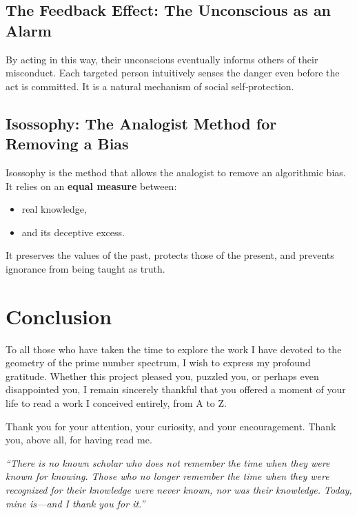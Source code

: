 \documentclass[12pt,oneside]{article}
\begin{document}
\subsection{The Feedback Effect: The Unconscious as an Alarm}

By acting in this way, their unconscious eventually informs others of their misconduct.  
Each targeted person intuitively senses the danger even before the act is committed.  
It is a natural mechanism of social self‑protection.

\subsection{Isossophy: The Analogist Method for Removing a Bias}

Isossophy is the method that allows the analogist to remove an algorithmic bias.  
It relies on an \textbf{equal measure} between:

\begin{itemize}
    \item real knowledge,
    \item and its deceptive excess.
\end{itemize}

It preserves the values of the past, protects those of the present, and prevents ignorance from being taught as truth.

\section*{Conclusion}

To all those who have taken the time to explore the work I have devoted to the geometry of the prime number spectrum, I wish to express my profound gratitude. Whether this project pleased you, puzzled you, or perhaps even disappointed you, I remain sincerely thankful that you offered a moment of your life to read a work I conceived entirely, from A to Z.

Thank you for your attention, your curiosity, and your encouragement. Thank you, above all, for having read me.

\bigskip

\noindent\textit{“There is no known scholar who does not remember the time when they were known for knowing. Those who no longer remember the time when they were recognized for their knowledge were never known, nor was their knowledge. Today, mine is—and I thank you for it.”}

\bigskip
\end{document}
